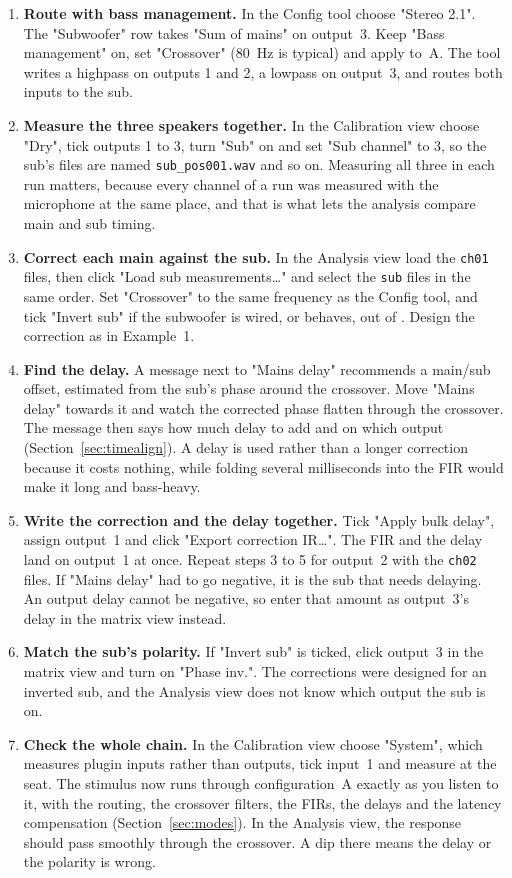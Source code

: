 \begin{enumerate}[nosep]
  \item \textbf{Route with bass management.} In the Config tool choose "Stereo 2.1". The "Subwoofer" row takes "Sum of mains" on output~3. Keep "Bass management" on, set "Crossover" (\SI{80}{\hertz} is typical) and apply to~A. The tool writes a highpass on outputs 1 and 2, a lowpass on output~3, and routes both inputs to the sub.
  \item \textbf{Measure the three speakers together.} In the Calibration view choose "Dry", tick outputs 1 to 3, turn "Sub" on and set "Sub channel" to 3, so the sub's files are named \texttt{sub\_pos001.wav} and so on. Measuring all three in each run matters, because every channel of a run was measured with the microphone at the same place, and that is what lets the analysis compare main and sub timing.
  \item \textbf{Correct each main against the sub.} In the Analysis view load the \texttt{ch01} files, then click "Load sub measurements\ldots" and select the \texttt{sub} files in the same order. Set "Crossover" to the same frequency as the Config tool, and tick "Invert sub" if the subwoofer is wired, or behaves, out of . Design the correction as in Example~1.
  \item \textbf{Find the delay.} A message next to "Mains delay" recommends a main/sub offset, estimated from the sub's phase around the crossover. Move "Mains delay" towards it and watch the corrected phase flatten through the crossover. The message then says how much delay to add and on which output (Section~\ref{sec:timealign}). A delay is used rather than a longer correction because it costs nothing, while folding several milliseconds into the FIR would make it long and bass-heavy.
  \item \textbf{Write the correction and the delay together.} Tick "Apply bulk delay", assign output~1 and click "Export correction IR\ldots". The FIR and the delay land on output~1 at once. Repeat steps 3 to 5 for output~2 with the \texttt{ch02} files. If "Mains delay" had to go negative, it is the sub that needs delaying. An output delay cannot be negative, so enter that amount as output~3's delay in the matrix view instead.
  \item \textbf{Match the sub's polarity.} If "Invert sub" is ticked, click output~3 in the matrix view and turn on "Phase inv.". The corrections were designed for an inverted sub, and the Analysis view does not know which output the sub is on.
  \item \textbf{Check the whole chain.} In the Calibration view choose "System", which measures plugin inputs rather than outputs, tick input~1 and measure at the seat. The stimulus now runs through configuration~A exactly as you listen to it, with the routing, the crossover filters, the FIRs, the delays and the latency compensation (Section~\ref{sec:modes}). In the Analysis view, the response should pass smoothly through the crossover. A dip there means the delay or the polarity is wrong.
\end{enumerate}

